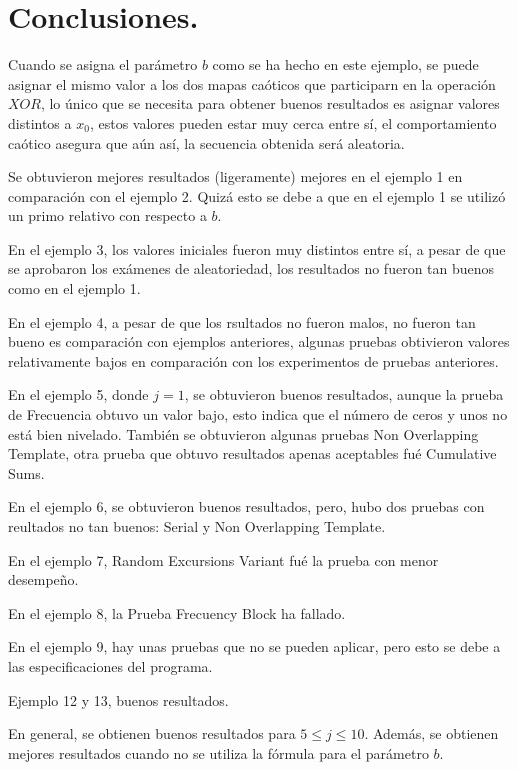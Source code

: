 \documentclass[10pt]{IEEEtran}
\begin{document}
\section{Conclusiones.}


Cuando se asigna el parámetro $b$ como se ha hecho en este ejemplo, se puede asignar el mismo valor a los dos mapas caóticos que participarn en la operación $XOR$, lo único que se necesita para obtener buenos resultados es asignar valores distintos a $x_{0}$, estos valores pueden estar muy cerca entre sí, el comportamiento caótico asegura que aún así, la secuencia obtenida será aleatoria.


Se obtuvieron mejores resultados  (ligeramente) mejores en el ejemplo 1 en comparación con el ejemplo 2. Quizá esto se debe a que en el ejemplo 1 se utilizó un primo relativo con respecto a $b$.

En el ejemplo 3, los valores iniciales fueron muy distintos entre sí, a pesar de que se aprobaron los exámenes de aleatoriedad, los resultados no fueron tan buenos como en el ejemplo 1.

En el ejemplo 4, a pesar de que los rsultados no fueron malos, no fueron tan bueno es comparación con ejemplos anteriores, algunas pruebas obtivieron valores relativamente bajos en comparación con los experimentos de pruebas anteriores.

En el ejemplo 5, donde $j=1$, se obtuvieron buenos resultados, aunque la prueba de Frecuencia obtuvo un valor bajo, esto indica que el número de ceros y unos no está bien nivelado. También se obtuvieron algunas pruebas  Non Overlapping Template, otra prueba que obtuvo resultados apenas aceptables fué Cumulative Sums.  


En el ejemplo 6, se obtuvieron buenos resultados, pero, hubo dos pruebas con reultados no tan buenos: Serial y Non Overlapping Template.

En el ejemplo 7, Random Excursions Variant fué la prueba con menor desempeño.

En el ejemplo 8, la Prueba Frecuency Block ha fallado.

En el ejemplo 9, hay unas pruebas que no se pueden aplicar, pero esto se debe a las especificaciones del programa.

Ejemplo 12 y 13, buenos resultados.

En general, se obtienen buenos resultados para $5 \leq j \leq 10$. Además, se obtienen mejores resultados cuando no se utiliza la fórmula para el parámetro $b$.
\end{document}
